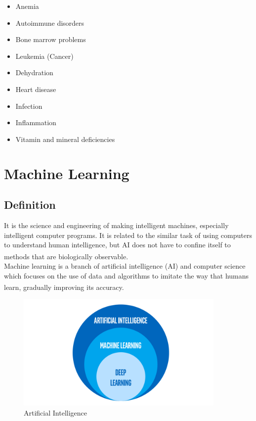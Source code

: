 \begin{itemize}
  \item Anemia
  \vspace{-0.05in}
  \item Autoimmune disorders
  \vspace{-0.05in}
  \item Bone marrow problems
  \vspace{-0.05in}
  \item Leukemia (Cancer)
  \vspace{-0.05in}
  \item Dehydration
  \vspace{-0.05in}
  \item Heart disease
  \vspace{-0.05in}
  \item Infection
  \vspace{-0.05in}
  \item Inflammation
  \vspace{-0.05in}
  \item Vitamin and mineral deficiencies
  \vspace{-0.05in}
\end{itemize}
\section{Machine Learning}
\subsection{Definition}
\hspace{\parindent}
It is the science and engineering of making intelligent machines, especially intelligent computer programs. It is related to the similar task of using computers to understand human intelligence, but AI does not have to confine itself to methods that are biologically observable. \textsuperscript{\cite{mccarthy2004artificial}}\\
Machine learning is a branch of artificial intelligence (AI) and computer science which focuses on the use of data and algorithms to imitate the way that humans learn, gradually improving its accuracy. \textsuperscript{\cite{ML-IBM}}

\vspace{0.2in}

\begin{figure}[h]
\centering
  \vspace{-0.1in}
    \centerline{\includegraphics[width = 4in]{../images/artificial-intelligence.png}}
    \caption{Artificial Intelligence}
\end{figure}

